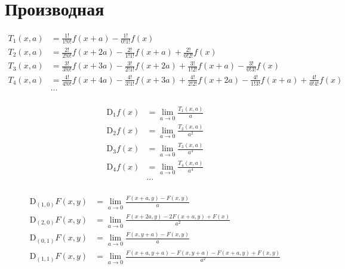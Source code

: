 
\section{Производная}

\begin{equation*}
\begin{aligned}
T_1(x,a) &= 
  \frac{1!}{1!0!} f(x + a) 
- \frac{1!}{0!1!} f(x)
\\
T_2(x,a) &= 
  \frac{2!}{2!0!} f(x + 2 a) 
- \frac{2!}{1!1!} f(x + a) 
+ \frac{2!}{0!2!} f(x)
\\
T_3(x,a) &=
  \frac{3!}{3!0!} f(x + 3 a) 
- \frac{3!}{2!1!} f(x + 2 a) 
+ \frac{3!}{1!2!} f(x + a)
- \frac{3!}{0!3!} f(x)
\\
T_4(x,a) &= 
  \frac{4!}{4!0!} f(x + 4 a) 
- \frac{4!}{3!1!} f(x + 3 a) 
+ \frac{4!}{2!2!} f(x + 2 a) 
- \frac{4!}{1!3!} f(x + a) 
+ \frac{4!}{0!4!} f(x)
\\
&\ldots
\\
\end{aligned}
\end{equation*}

\begin{equation*}
\begin{aligned}
\mathrm{D}_1 f(x) &= \lim_{a \to 0} \frac{T_1(x,a)}{a} \\
%
\mathrm{D}_2 f(x) &= \lim_{a \to 0} \frac{T_2(x,a)}{a^2} \\
%
\mathrm{D}_3 f(x) &= \lim_{a \to 0} \frac{T_3(x,a)}{a^3} \\
%
\mathrm{D}_4 f(x) &= \lim_{a \to 0} \frac{T_4(x,a)}{a^4} \\
%
&\ldots \\
\end{aligned}
\end{equation*}

\begin{equation*}
\begin{aligned}
\mathrm{D}_{(1,0)} F(x, y) &=
\lim_{a \to 0}{\frac{
  F(x + a, y)
- F(x, y)
}{a}}
\\
\mathrm{D}_{(2,0)} F(x, y) &=
\lim_{a \to 0}{\frac{
  F(x + 2 a, y)
- 2 F(x + a, y)
+ F(x)
}{a^2}}
\\
\mathrm{D}_{(0,1)} F(x, y) &=
\lim_{a \to 0}{\frac{
  F(x, y + a)
- F(x, y)
}{a}}
\\
\mathrm{D}_{(1,1)} F(x, y) &=
\lim_{a \to 0}{\frac{{
  F(x + a, y + a)
- F(x, y + a)
- F(x + a, y)
+ F(x, y)
}}{a^2}}
\\
\end{aligned}
\end{equation*}
